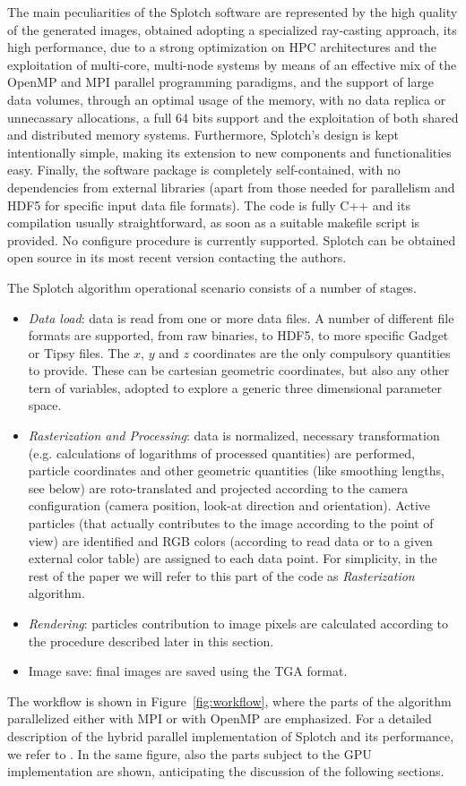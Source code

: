 \documentclass[11pt]{article}
\begin{document}
The main peculiarities of the Splotch software are represented by the 
high quality of the generated images, obtained adopting a specialized ray-casting 
approach, its high performance, due to a strong optimization on HPC architectures and the exploitation of multi-core, multi-node 
systems by means of an effective mix of the OpenMP and MPI parallel programming paradigms, and
the support of large data volumes, through an optimal usage of the memory, with
no data replica or unnecassary allocations, a full 64 bits support and the exploitation
of both shared and distributed memory systems. Furthermore, Splotch's design is kept 
intentionally simple, making its extension to new components and functionalities easy. 
Finally, the software package is completely self-contained, with no dependencies from external 
libraries (apart from those needed for parallelism and HDF5 \cite{hdf5}  for
specific input data file formats). The code is fully C++ and its compilation
usually straightforward, as soon as a suitable makefile script is provided.
No configure procedure is currently supported.  Splotch  
can be obtained open source in its most recent version contacting the authors.

The Splotch algorithm operational scenario consists of a number of stages. 
\begin{itemize}
\item
{\it Data load}: data is read from one or more data files. A number of different file
formats are supported, from raw binaries, to HDF5, to more specific 
Gadget \cite{gadgeturl} or Tipsy \cite{tipsyurl}
files. The $x$, $y$ and $z$ coordinates are the only compulsory quantities to provide.
These can be cartesian geometric coordinates, but also any other tern 
of variables, adopted to explore a generic three dimensional parameter space.
\item
{\it Rasterization and Processing}: data is normalized, necessary 
transformation (e.g. calculations of logarithms of processed quantities) are performed,
particle coordinates and other geometric quantities 
(like smoothing lengths, see below) are roto-translated and projected according to the 
camera configuration (camera position, look-at direction and orientation). 
Active particles (that actually contributes to the image according to the point of view)
are identified and RGB colors (according to read data or to a given
external color table) are assigned to each data point. For simplicity, in the rest 
of the paper we will refer to this part of the code as {\it Rasterization} algorithm.
\item
{\it Rendering}: particles contribution to image pixels are calculated according
to the procedure described later in this section.
\item
Image save: final images are saved using the TGA format.
\end{itemize}
The workflow is shown in Figure~\ref{fig:workflow}, where the parts of the algorithm parallelized
either with MPI or with OpenMP are emphasized. For a detailed description of
the hybrid parallel implementation of Splotch and its performance, 
we refer to \cite{jin:high-performance}.
In the same figure, also the parts subject to the GPU implementation are shown, 
anticipating the discussion of the following sections.
\end{document}
